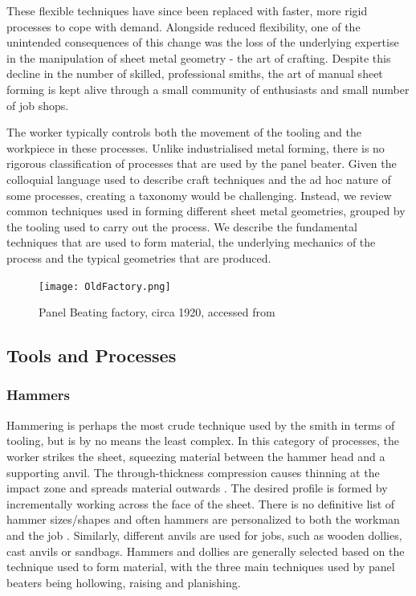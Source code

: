 These flexible techniques have since been replaced with faster, more rigid processes to cope with demand. Alongside reduced flexibility, one of the unintended consequences of this change was the loss of the underlying expertise in the manipulation of sheet metal geometry - the art of crafting.  Despite this decline in the number of skilled, professional smiths, the art of manual sheet forming is kept alive through a small community of enthusiasts and small number of job shops. 

The worker typically controls both the movement of the tooling and the workpiece in these processes. Unlike industrialised metal forming, there is no rigorous classification of processes that are used by the panel beater. Given the colloquial language used to describe craft techniques and the ad hoc nature of some processes, creating a taxonomy would be challenging. Instead, we review common techniques used in forming different sheet metal geometries, grouped by the tooling used to carry out the process. We describe the fundamental techniques that are used to form material, the underlying mechanics of the process and the typical geometries that are produced. 


\begin{figure}[h]
	\centering
	\texttt{[image: OldFactory.png]}
	\caption{Panel Beating factory, circa 1920, accessed from \citep{clementandboggis2018}}
	\label{fig:OldFactory}
\end{figure}


\subsection{Tools and Processes} \label{sec:ToolsandProc}
\subsubsection*{Hammers}

Hammering is perhaps the most crude technique used by the smith in terms of tooling, but is by no means the least complex. In this category of processes, the worker strikes the sheet, squeezing material between the hammer head and a supporting anvil. The through-thickness compression causes thinning at the impact zone and spreads material outwards \citep{Music2012TheTools}. The desired profile is formed by incrementally working across the face of the sheet. There is no definitive list of hammer sizes/shapes and often hammers are personalized to both the workman and the job \citep{Barr2013ProfessionalFabrication}. Similarly, different anvils are used for jobs, such as wooden dollies, cast anvils or sandbags. Hammers and dollies are generally selected based on the technique used to form material, with the three main techniques used by panel beaters being hollowing, raising and planishing. 

